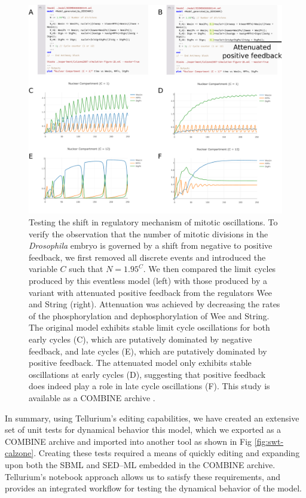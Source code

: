 \documentclass[10pt,letterpaper]{article}
\begin{document}
\begin{figure}
  \includegraphics[width=1.0\textwidth]{calzone-limit-cycles.pdf}
  \caption{Testing the shift in regulatory mechanism of mitotic oscillations. To verify the observation \cite{calzone2007dynamical} that the number of mitotic divisions in the \textit{Drosophila} embryo is governed by a shift from negative to positive feedback, we first removed all discrete events and introduced the variable $C$ such that $N=1.95^C$. We then compared the limit cycles produced by this eventless model (left) with those produced by a variant with attenuated positive feedback from the regulators Wee and String (right). Attenuation was achieved by decreasing the rates of the phosphorylation and dephosphorylation of Wee and String. The original model exhibits stable limit cycle oscillations for both early cycles (C), which are putatively dominated by negative feedback, and late cycles (E), which are putatively dominated by positive feedback. The attenuated model only exhibits stable oscillations at early cycles (D), suggesting that positive feedback does indeed play a role in late cycle oscillations (F). This study is available as a COMBINE archive \cite{calzone-feedback-archive}. }
  \label{fig:calzone-limit-cycles}
\end{figure}

In summary, using Tellurium's editing capabilities, we have created an extensive set of unit tests for dynamical behavior this model, which we exported as a COMBINE archive and imported into another tool as shown in Fig \ref{fig:swt-calzone}. Creating these tests required a means of quickly editing and expanding upon both the SBML and SED--ML embedded in the COMBINE archive. Tellurium's notebook approach allows us to satisfy these requirements, and provides an integrated workflow for testing the dynamical behavior of the model.
\end{document}
